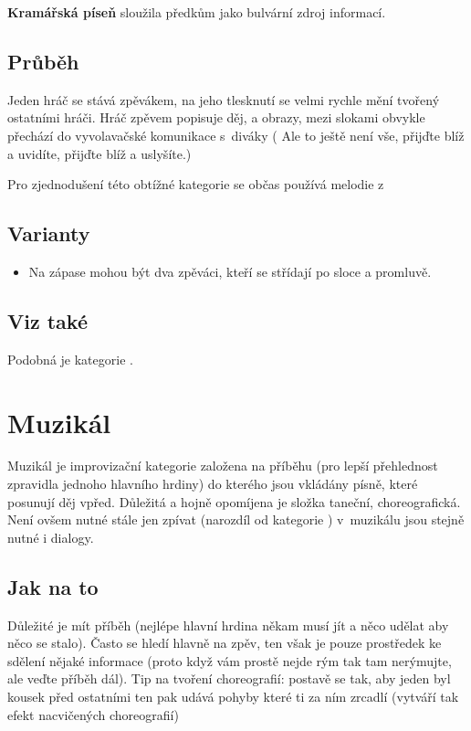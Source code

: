 \textbf{Kramářská píseň} sloužila předkům jako bulvární zdroj informací. 
 
\subsection{Průběh} Jeden hráč se stává zpěvákem, na jeho tlesknutí se velmi rychle mění  tvořený ostatními hráči. 
Hráč zpěvem popisuje děj, a obrazy, mezi slokami obvykle přechází do vyvolavačské komunikace s~diváky ( Ale to ještě není vše, přijďte blíž a uvidíte, přijďte blíž a uslyšíte.) 
 
Pro zjednodušení této obtížné kategorie se občas používá melodie z~  
 
\subsection{Varianty} \begin{itemize}
\item  Na zápase mohou být dva zpěváci, kteří se střídají po sloce a promluvě.
\end{itemize}
 
\subsection{Viz také} Podobná je kategorie . 
 
 
 
 
 
\needspace{5cm} \section{Muzikál} \label{muzikál}  
 
Muzikál je improvizační kategorie založena na příběhu (pro lepší přehlednost zpravidla jednoho hlavního hrdiny) do kterého jsou vkládány písně, které posunují děj vpřed. Důležitá a hojně opomíjena je složka taneční, choreografická. Není ovšem nutné stále jen zpívat (narozdíl od kategorie ) v~muzikálu jsou stejně nutné i dialogy. 
 
\subsection{Jak na to}  
Důležité je mít příběh (nejlépe hlavní hrdina někam musí jít a něco udělat aby něco se stalo). Často se hledí hlavně na zpěv, ten však je pouze prostředek ke sdělení nějaké informace (proto když vám prostě nejde rým tak tam nerýmujte, ale veďte příběh dál). Tip na tvoření choreografií: postavě se tak, aby jeden byl kousek před ostatními ten pak udává pohyby které ti za ním zrcadlí (vytváří tak efekt nacvičených choreografií) 
 

